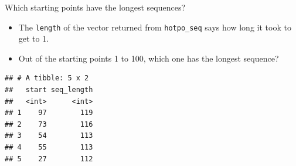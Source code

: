 \documentclass[ignorenonframetext,]{beamer}
\newenvironment{Shaded}{\begin{snugshade}}{\end{snugshade}}
\newcommand{\DataTypeTok}[1]{\textcolor[rgb]{0.13,0.29,0.53}{#1}}
\newcommand{\DecValTok}[1]{\textcolor[rgb]{0.00,0.00,0.81}{#1}}
\newcommand{\KeywordTok}[1]{\textcolor[rgb]{0.13,0.29,0.53}{\textbf{#1}}}
\newcommand{\NormalTok}[1]{#1}
\newcommand{\OperatorTok}[1]{\textcolor[rgb]{0.81,0.36,0.00}{\textbf{#1}}}
\newcommand{\StringTok}[1]{\textcolor[rgb]{0.31,0.60,0.02}{#1}}
\providecommand{\tightlist}{%
  \setlength{\itemsep}{0pt}\setlength{\parskip}{0pt}}
\begin{document}
\begin{frame}[fragile]{Which starting points have the longest
sequences?}
\protect\hypertarget{which-starting-points-have-the-longest-sequences}{}

\begin{itemize}
\tightlist
\item
  The \texttt{length} of the vector returned from \texttt{hotpo\_seq}
  says how long it took to get to 1.
\item
  Out of the starting points 1 to 100, which one has the longest
  sequence?
\end{itemize}

\small

\begin{Shaded}
\end{Shaded}

\begin{verbatim}
## # A tibble: 5 x 2
##   start seq_length
##   <int>      <int>
## 1    97        119
## 2    73        116
## 3    54        113
## 4    55        113
## 5    27        112
\end{verbatim}

\normalsize

\end{frame}
\end{document}
